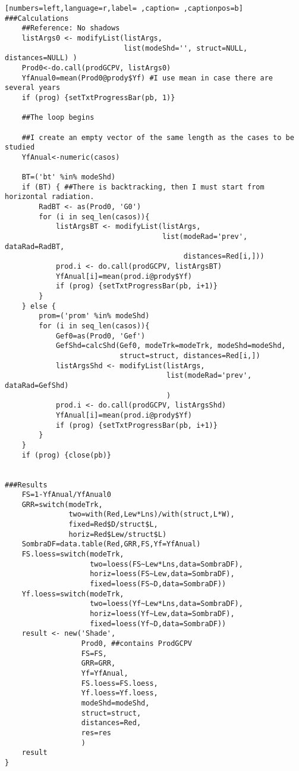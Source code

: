 \begin{lstlisting}[numbers=left,language=r,label= ,caption= ,captionpos=b]
###Calculations	
    ##Reference: No shadows	
    listArgs0 <- modifyList(listArgs,
                            list(modeShd='', struct=NULL, distances=NULL) )
    Prod0<-do.call(prodGCPV, listArgs0)
    YfAnual0=mean(Prod0@prody$Yf) #I use mean in case there are several years
    if (prog) {setTxtProgressBar(pb, 1)}

    ##The loop begins

    ##I create an empty vector of the same length as the cases to be studied
    YfAnual<-numeric(casos) 

    BT=('bt' %in% modeShd)
    if (BT) { ##There is backtracking, then I must start from horizontal radiation.
        RadBT <- as(Prod0, 'G0')
        for (i in seq_len(casos)){
            listArgsBT <- modifyList(listArgs,
                                     list(modeRad='prev', dataRad=RadBT,
                                          distances=Red[i,]))
            prod.i <- do.call(prodGCPV, listArgsBT)
            YfAnual[i]=mean(prod.i@prody$Yf)
            if (prog) {setTxtProgressBar(pb, i+1)}
        }
    } else {
        prom=('prom' %in% modeShd)
        for (i in seq_len(casos)){
            Gef0=as(Prod0, 'Gef')
            GefShd=calcShd(Gef0, modeTrk=modeTrk, modeShd=modeShd,
                           struct=struct, distances=Red[i,])
            listArgsShd <- modifyList(listArgs,
                                      list(modeRad='prev', dataRad=GefShd)
                                      )
            prod.i <- do.call(prodGCPV, listArgsShd)
            YfAnual[i]=mean(prod.i@prody$Yf)
            if (prog) {setTxtProgressBar(pb, i+1)}
        }
    }
    if (prog) {close(pb)}


###Results
    FS=1-YfAnual/YfAnual0
    GRR=switch(modeTrk,
               two=with(Red,Lew*Lns)/with(struct,L*W),
               fixed=Red$D/struct$L,
               horiz=Red$Lew/struct$L)
    SombraDF=data.table(Red,GRR,FS,Yf=YfAnual)
    FS.loess=switch(modeTrk,
                    two=loess(FS~Lew*Lns,data=SombraDF),
                    horiz=loess(FS~Lew,data=SombraDF),
                    fixed=loess(FS~D,data=SombraDF))
    Yf.loess=switch(modeTrk,
                    two=loess(Yf~Lew*Lns,data=SombraDF),
                    horiz=loess(Yf~Lew,data=SombraDF),
                    fixed=loess(Yf~D,data=SombraDF))
    result <- new('Shade',
                  Prod0, ##contains ProdGCPV
                  FS=FS,
                  GRR=GRR,
                  Yf=YfAnual,
                  FS.loess=FS.loess,
                  Yf.loess=Yf.loess,
                  modeShd=modeShd,
                  struct=struct,
                  distances=Red,
                  res=res
                  )
    result
}
\end{lstlisting}
